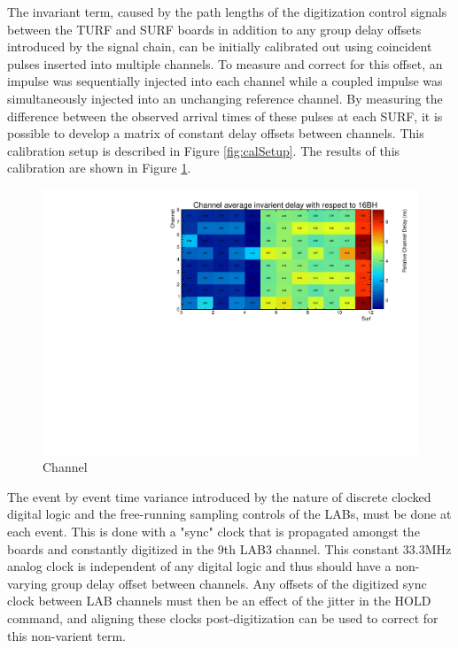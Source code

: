 		The invariant term, caused by the path lengths of the digitization control signals between the TURF and SURF boards in addition to any group delay offsets introduced by the signal chain, can be initially calibrated out using coincident pulses inserted into multiple channels.  To measure and correct for this offset, an impulse was sequentially injected into each channel while a coupled impulse was simultaneously injected into an unchanging reference channel.  By measuring the difference between the observed arrival times of these pulses at each SURF, it is possible to develop a matrix of constant delay offsets between channels.  This calibration setup is described in Figure \ref{fig:calSetup}.  The results of this calibration are shown in Figure \ref{fig:delayOffsets}.
		

	\begin{figure}
		\includegraphics[width=\textwidth]{figures/averagedCableDelay}
		\caption{Channel}
		\label{fig:delayOffsets}
	\end{figure}
		
		
		The event by event time variance introduced by the nature of discrete clocked digital logic and the free-running sampling controls of the LABs, must be done at each event.  This is done with a "sync" clock that is propagated amongst the boards and constantly digitized in the 9th LAB3 channel.  This constant  33.3MHz analog clock is independent of any digital logic and thus should have a non-varying group delay offset between channels.  Any offsets of the digitized sync clock between LAB channels must then be an effect of the jitter in the HOLD command, and aligning these clocks post-digitization can be used to correct for this non-varient term.
		



